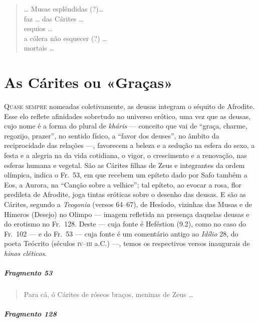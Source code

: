{\begin{verse}
\ast\quad\ast\quad\ast

\ldots{} Musas esplêndidas (?)\ldots{}\\
faz \ldots{} das Cárites \ldots{}\\
esquios \ldots{}\\
a cólera não esquecer (?) \ldots{}\\
mortais \ldots{}
\end{verse}


\chapter{As Cárites ou «Graças»}

\textsc{Quase sempre} nomeadas coletivamente, as deusas integram o séquito de Afrodite.
Esse elo reflete afinidades sobretudo no universo erótico, uma vez que as
deusas, cujo nome é a forma do plural de \textit{kháris }--- conceito que vai de
“graça, charme, regozijo, prazer”, no sentido físico, a “favor dos deuses”, no
âmbito da reciprocidade das relações ---, favorecem a beleza e a sedução na
esfera do sexo, a festa e a alegria na da vida cotidiana, o vigor, o
crescimento e a renovação, nas esferas humana e vegetal. São as Cárites
filhas de Zeus e integrantes da ordem olímpica, indica o Fr.~53, em que
recebem um epíteto dado por Safo também a Eos, a Aurora, na ``Canção sobre a velhice'';
tal epíteto, ao evocar a rosa, flor predileta de Afrodite, joga tintas eróticas
sobre o desenho das deusas. E são as Cárites, segundo a \textit{Teogonia}
(versos 64--67), de Hesíodo, vizinhas das Musas e de Hímeros (Desejo) no Olimpo --- imagem refletida na presença daquelas deusas e do erotismo no Fr.~128. Deste --- cuja fonte é Heféstion (9.2), como no caso do Fr.~102 --- e do		\EP[]
Fr.~53 --- cuja fonte é um comentário antigo ao \textit{Idílio }28, do poeta
Teócrito (séculos \textsc{iv}--\textsc{iii} a.C.) ---, temos os respectivos versos inaugurais de
\textit{hinos cléticos}.

\paragraph{Fragmento 53} %

\begin{verse}
Para cá, ó Cárites de róseos braços, meninas de \qb{}Zeus \ldots{}
\end{verse}

\paragraph{Fragmento 128} %

}

